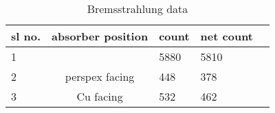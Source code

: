 \begin{table}[H]
\begin{tabular}{|lcllll|}
\multicolumn{1}{|l|}{sl no.} & \multicolumn{2}{c|}{absorber position}        & \multicolumn{1}{l|}{count} & \multicolumn{1}{l|}{net count} &  \\ \hline
\multicolumn{1}{|l|}{1}      & \multicolumn{2}{c|}{}                         & \multicolumn{1}{l|}{5880}  & \multicolumn{1}{l|}{5810}      &  \\ \hline
\multicolumn{1}{|l|}{2}      & \multicolumn{2}{c|}{perspex facing}           & \multicolumn{1}{l|}{448}   & \multicolumn{1}{l|}{378}       &  \\ \hline
\multicolumn{1}{|l|}{3}      & \multicolumn{2}{c|}{Cu facing}                & \multicolumn{1}{l|}{532}   & \multicolumn{1}{l|}{462}       &  \\ \hline
\end{tabular}

\caption{Bremsstrahlung data}
\end{table}